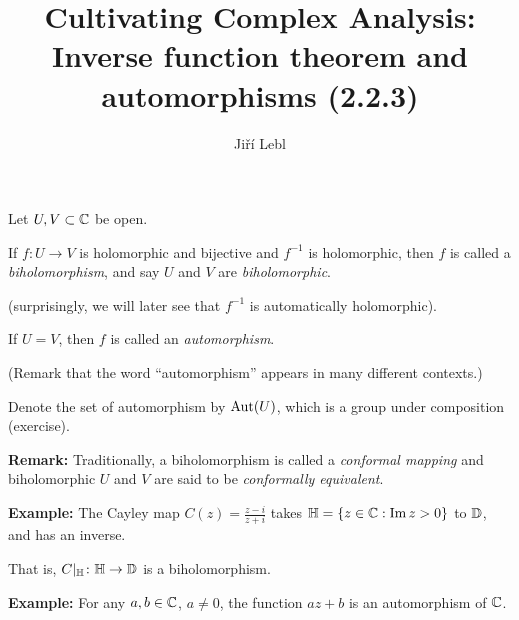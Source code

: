 \documentclass[10pt,aspectratio=169]{beamer}
\author{Ji\v{r}\'i Lebl}
\institute[OSU]{%
Departemento pri Matematiko de Oklahoma {\^S}tata Universitato}
\title{Cultivating Complex Analysis:\\%
Inverse function theorem and automorphisms (2.2.3)}
\date{}
\begin{document}
\begin{frame}
\titlepage
\end{frame}

\begin{frame}
Let $U, V \subset {\mathbb{C}}$ be open.

\medskip
\pause

If $f \colon U \to V$ is holomorphic and bijective and
$f^{-1}$ is holomorphic, then $f$ is 
called a \emph{biholomorphism}, and say $U$ and $V$
are \emph{biholomorphic}.

\pause
(surprisingly, we will later see that $f^{-1}$ is automatically holomorphic).

\medskip
\pause

If $U = V$, then $f$ is called an \emph{automorphism}.

\pause
(Remark that the word ``automorphism'' appears in many different contexts.)

\medskip
\pause

Denote the set of automorphism by $\operatorname{Aut}(U)$, which is a group under
composition (exercise).

\medskip
\pause

\textbf{Remark:} Traditionally, a biholomorphism is called a
\emph{conformal mapping} and biholomorphic $U$ and $V$ are said to be
\emph{conformally equivalent}.

\medskip
\pause

\textbf{Example:}
The Cayley map
$C(z)
=
\frac{z - i}{z + i}$
takes ${\mathbb{H}} = \{ z \in {\mathbb{C}} : \operatorname{Im} z > 0 \}$ to ${\mathbb{D}}$, and has an inverse.

That is, $C|_{{\mathbb{H}}} \colon {\mathbb{H}} \to {\mathbb{D}}$ is a biholomorphism.

\medskip
\pause

\textbf{Example:}
For any $a,b \in {\mathbb{C}}$, $a \not= 0$, the function $a z + b$ is an automorphism of ${\mathbb{C}}$.
\end{frame}
\end{document}
